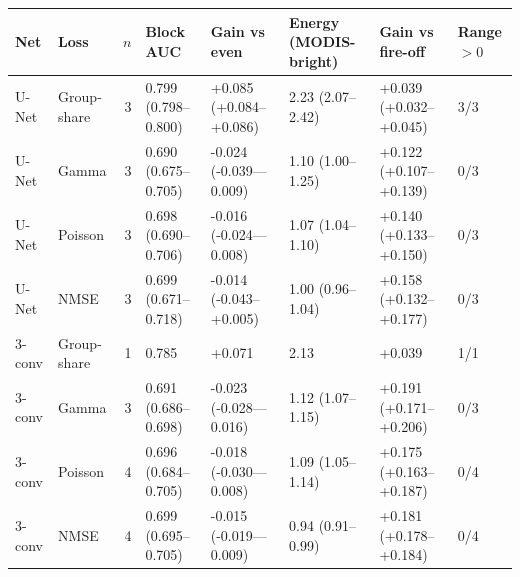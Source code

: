 \begin{tabular}{llrlllll}
\toprule
Net & Loss & $n$ & Block AUC & Gain vs even & Energy (MODIS-bright) & Gain vs fire-off & Range $>0$ \\
\midrule
U-Net & Group-share & 3 & 0.799 (0.798--0.800) & +0.085 (+0.084--+0.086) & 2.23 (2.07--2.42) & +0.039 (+0.032--+0.045) & 3/3 \\
U-Net & Gamma & 3 & 0.690 (0.675--0.705) & -0.024 (-0.039---0.009) & 1.10 (1.00--1.25) & +0.122 (+0.107--+0.139) & 0/3 \\
U-Net & Poisson & 3 & 0.698 (0.690--0.706) & -0.016 (-0.024---0.008) & 1.07 (1.04--1.10) & +0.140 (+0.133--+0.150) & 0/3 \\
U-Net & NMSE & 3 & 0.699 (0.671--0.718) & -0.014 (-0.043--+0.005) & 1.00 (0.96--1.04) & +0.158 (+0.132--+0.177) & 0/3 \\
\midrule
3-conv & Group-share & 1 & 0.785 & +0.071 & 2.13 & +0.039 & 1/1 \\
3-conv & Gamma & 3 & 0.691 (0.686--0.698) & -0.023 (-0.028---0.016) & 1.12 (1.07--1.15) & +0.191 (+0.171--+0.206) & 0/3 \\
3-conv & Poisson & 4 & 0.696 (0.684--0.705) & -0.018 (-0.030---0.008) & 1.09 (1.05--1.14) & +0.175 (+0.163--+0.187) & 0/4 \\
3-conv & NMSE & 4 & 0.699 (0.695--0.705) & -0.015 (-0.019---0.009) & 0.94 (0.91--0.99) & +0.181 (+0.178--+0.184) & 0/4 \\
\bottomrule
\end{tabular}
